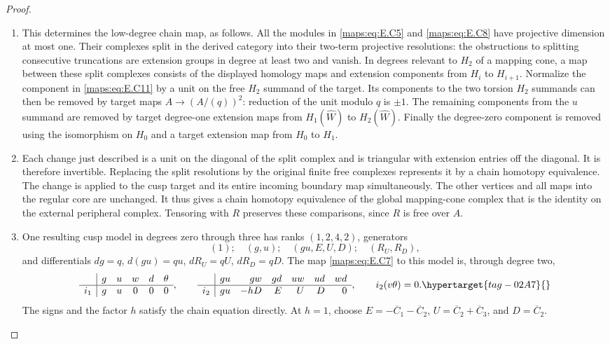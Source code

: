 \documentclass[11pt,a4paper]{article}
\numberwithin{equation}{section}
\theoremstyle{definition}
\begin{document}
\begin{proof}
\begin{enumerate}[label=\arabic*.,leftmargin=*]
\item This determines the low-degree chain map, as follows. All the
modules in \eqref{maps:eq:E.C5} and \eqref{maps:eq:E.C8} have projective dimension
at most one. Their complexes split in the derived
category into their two-term projective resolutions:
the obstructions to splitting consecutive truncations
are extension groups in degree at least two and vanish.
In degrees relevant to $H_2$ of a mapping cone, a map
between these split complexes consists of the displayed
homology maps and extension components from $H_i$ to
$H_{i+1}$. Normalize the component in \eqref{maps:eq:E.C11} by a unit
on the free $H_2$ summand of the target. Its components
to the two torsion $H_2$ summands can then be removed
by target maps $A\to(A/(q))^2$: reduction of the unit
modulo $q$ is $\pm1$. The remaining components from
the $u$ summand are removed by target degree-one
extension maps from $H_1(\widehat W)$ to
$H_2(\widehat W)$. Finally the degree-zero component
is removed using the isomorphism on $H_0$ and a target
extension map from $H_0$ to $H_1$.

\item Each change just described is a unit on the diagonal
of the split complex and is triangular with extension
entries off the diagonal. It is therefore invertible.
Replacing the split resolutions by the original finite
free complexes represents it by a chain homotopy
equivalence.  The change
is applied to the cusp target and its entire incoming
boundary map simultaneously. The other vertices and
all maps into the regular core are unchanged. It thus
gives a chain homotopy equivalence of the global
mapping-cone complex that is the identity on the
external peripheral complex. Tensoring with $R$ preserves these comparisons,
since $R$ is free over $A$.

\item One resulting cusp model in degrees zero through three
has ranks $(1,2,4,2)$, generators
\[
 (1);\quad(g,u);\quad(gu,E,U,D);\quad(R_U,R_D),
\]
and differentials $dg=q$, $d(gu)=qu$,
$dR_U=qU$, $dR_D=qD$. The map \eqref{maps:eq:E.C7} to this model
is, through degree two,
\begin{equation}
 \begin{array}{c|ccccc}
  &g&u&w&d&\theta\\ \hline
  i_1&g&u&0&0&0
 \end{array},\qquad
 \begin{array}{c|rrrrrr}
  &gu&gw&gd&uw&ud&wd\\ \hline
  i_2&gu&-hD&E&U&D&0
 \end{array},
 \qquad i_2(v\theta)=0.
 \hypertarget{tag-02A7}{}\label{maps:eq:E.C12}
\end{equation}
The signs and the factor $h$ satisfy the chain equation
directly. At $h=1$, choose
$E=-\overline C_1-\overline C_2$,
$U=\overline C_2+\overline C_3$, and
$D=\overline C_2$.


\end{enumerate}
\end{proof}
\end{document}
